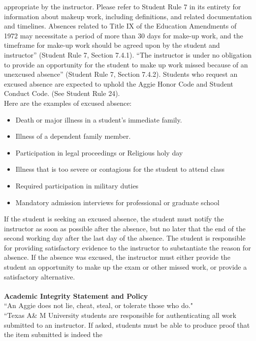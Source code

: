 \documentclass[letterpaper,10pt]{report}
\begin{document}
appropriate	by	the	instructor.
Please	 refer	 to	 Student	 Rule	 7 in	its	entirety	 for	information	about	makeup	work,	including	 definitions,	
and	related	documentation	and	timelines.
Absences	related	to	Title	IX	of	the	Education	Amendments	of	1972	may	necessitate	a	period	of	more	than	
30	days	for	make-up	work,	and	the	timeframe	 for	make-up	work	should	be	agreed	upon	by	the	student	
and	instructor”	(Student	Rule	7,	Section	7.4.1).
“The	instructor	is	under	no	obligation	to	provide	an	opportunity	for	the	student	to	make	up	work	missed	
because	of	an	unexcused	absence”	(Student	Rule	7,	Section	7.4.2).
Students	 who	 request	 an	 excused	 absence are	 expected	 to	 uphold	 the	 Aggie	 Honor	 Code	 and	 Student	
Conduct	Code.	(See	Student	Rule	24).\\
Here	are	the	examples	of	excused	absence:
\begin{itemize}
  \setlength\itemsep{0.05em}
\item Death	or	major	illness	in	a	student’s	immediate	family.
\item  Illness	of	a	dependent	family	member.
\item  Participation	in	legal	proceedings	or	Religious	holy	day
\item  Illness	that	is	too	severe	or	contagious	for	the	student	to	attend	class
\item  Required	participation	in	military	duties
\item  Mandatory	admission	interviews	for	professional	or	graduate	school

\end{itemize}
If	 the	student	is	seeking	an	excused	absence,	 the	student	must	notify	 the	instructor	as	soon	as	possible	
after	the	absence,	but	no	later	that	the	end	of	the	second	working	day	after	the	last	day	of	the	absence.
The	student	is	responsible	for	providing	satisfactory	evidence	to	the	instructor	to	substantiate	the	reason	
for	absence.	If	the	absence	was	excused,	the	instructor	must	either	provide	the	student	an	opportunity	to	
make	up	the	exam	or	other	missed	work, or	provide	a	satisfactory	alternative.\\
\:\
\\
\textbf{Academic	Integrity	Statement	and	Policy}\\
``An	Aggie	does	not	lie,	cheat,	steal,	or	tolerate	those	who	do."\\
“Texas A\& M University students are responsible for authenticating all work submitted to an 
instructor. If asked, students must be able to produce proof that the item submitted is indeed the 
\end{document}
